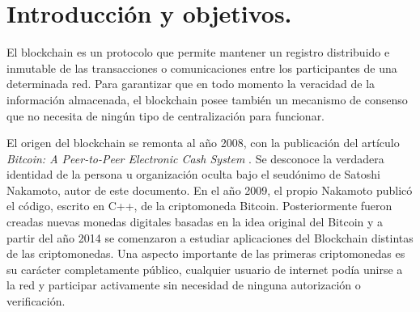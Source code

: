 
\cleardoublepage



\chapter{Introducción y objetivos.}
\label{introduccion}

El blockchain es un protocolo que permite mantener un registro distribuido e inmutable de las transacciones o comunicaciones entre los participantes de una determinada red. Para garantizar que en todo momento la veracidad de la información almacenada, el blockchain posee también un mecanismo de consenso que no necesita de ningún tipo de centralización para funcionar.

El origen del blockchain se remonta al año 2008, con la publicación del artículo \textit{Bitcoin: A Peer-to-Peer Electronic Cash System} \citep{bitcoin}. Se desconoce la verdadera identidad de la persona u organización oculta bajo el seudónimo de Satoshi Nakamoto, autor de este documento. %
En el año 2009, el propio Nakamoto publicó el código, escrito en C++, de la criptomoneda Bitcoin. Posteriormente fueron creadas nuevas monedas digitales basadas en la idea original del Bitcoin y a partir del año 2014 se comenzaron a estudiar aplicaciones del Blockchain distintas de las criptomonedas. Una aspecto importante de las primeras criptomonedas es su carácter completamente público, cualquier usuario de internet podía unirse a la red y participar activamente sin necesidad de ninguna autorización o verificación. 

